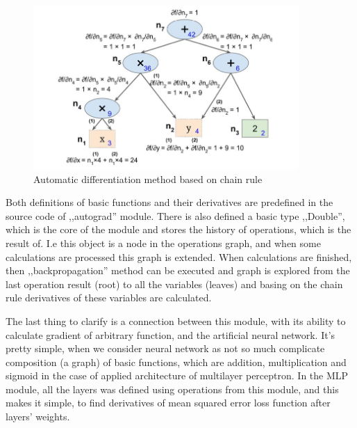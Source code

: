 \documentclass{classrep}
\begin{document}
{{            \begin{figure}[!htbp]
                \centering
                \includegraphics[width=0.9\textwidth]{img/autograd.jpg}
                \caption{Automatic differentiation method based on chain rule}
                \label{fig:autograd}
            \end{figure}
            \FloatBarrier

            Both definitions of basic functions and their derivatives are predefined in the source
            code of ,,autograd'' module. There is also defined a basic type ,,Double'', which is the
            core of the module and stores the history of operations, which is the result of. I.e
            this object is a node in the operations graph, and when some calculations are processed
            this graph is extended. When calculations are finished, then ,,backpropagation'' method
            can be executed and graph is explored from the last operation result (root) to all the
            variables (leaves) and basing on the chain rule derivatives of these variables are
            calculated.

            The last thing to clarify is a connection between this module, with its ability to
            calculate gradient of arbitrary function, and the artificial neural network. It's pretty
            simple, when we consider neural network as not so much complicate composition (a graph)
            of basic functions, which are addition, multiplication and sigmoid in the case of
            applied architecture of multilayer perceptron. In the MLP module, all the layers was
            defined using operations from this module, and this makes it simple, to find derivatives
            of mean squared error loss function after layers' weights.
        }
    }
\end{document}
